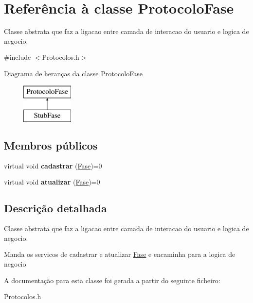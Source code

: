 \hypertarget{class_protocolo_fase}{
\section{\-Referência à classe \-Protocolo\-Fase}
\label{class_protocolo_fase}
}


\-Classe abstrata que faz a ligacao entre camada de interacao do usuario e logica de negocio.  




{\ttfamily \#include $<$\-Protocolos.\-h$>$}

\-Diagrama de heranças da classe \-Protocolo\-Fase\begin{figure}[H]
\begin{center}
\leavevmode
\includegraphics[height=2.000000cm]{class_protocolo_fase}
\end{center}
\end{figure}
\subsection*{\-Membros públicos}
\begin{DoxyCompactItemize}
\item 
\hypertarget{class_protocolo_fase_aac28718e85013963a84bb2ba5388e33f}{
virtual void {\bfseries cadastrar} (\hyperlink{class_fase}{\-Fase})=0}
\label{class_protocolo_fase_aac28718e85013963a84bb2ba5388e33f}

\item 
\hypertarget{class_protocolo_fase_a6237c5adc12aa6e5e5b2326b46d09b23}{
virtual void {\bfseries atualizar} (\hyperlink{class_fase}{\-Fase})=0}
\label{class_protocolo_fase_a6237c5adc12aa6e5e5b2326b46d09b23}

\end{DoxyCompactItemize}


\subsection{\-Descrição detalhada}
\-Classe abstrata que faz a ligacao entre camada de interacao do usuario e logica de negocio. 

\-Manda os servicos de cadastrar e atualizar \hyperlink{class_fase}{\-Fase} e encaminha para a logica de negocio 

\-A documentação para esta classe foi gerada a partir do seguinte ficheiro\-:\begin{DoxyCompactItemize}
\item 
\-Protocolos.\-h\end{DoxyCompactItemize}
